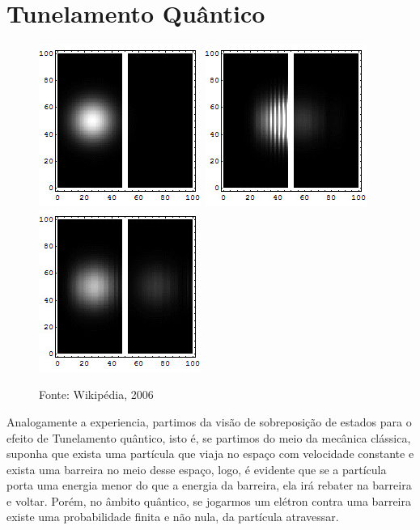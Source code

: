 \documentclass[
	12pt,				%
	oneside,			%
	a4paper,			%
	english,			%
	french,				%
	spanish,			%
	brazil,				%
	]{abntex2}
\begin{document}
\section{Tunelamento Quântico}
\begin{figure}[h!]
	\centering
	\includegraphics[scale=1]{tunelj1.jpg}
	\includegraphics[scale=1]{tunelj2.jpg}
	\includegraphics[scale=1]{tunelj3.jpg}		
	\caption{Fonte: Wikipédia, 2006}
	\label{fig:tunel0}
\end{figure}

Analogamente a experiencia, partimos da visão de sobreposição de estados para o efeito de Tunelamento quântico, isto é, se partimos do meio da mecânica clássica, suponha que exista uma partícula que viaja no espaço com velocidade constante e exista uma barreira no meio desse espaço, logo, é evidente que se a partícula porta uma energia menor do que a energia da barreira, ela irá rebater na barreira e voltar. Porém, no âmbito quântico, se jogarmos um elétron contra uma barreira existe uma probabilidade finita e não nula, da partícula atravessar.
\end{document}
